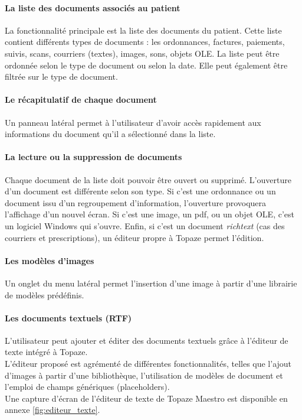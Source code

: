 \paragraph*{La liste des documents associés au patient\\}
La fonctionnalité principale est la liste des documents du patient. Cette liste contient différents types de documents : les ordonnances, factures, paiements, suivis, scans, courriers (textes), images, sons, objets \gls{OLE}. La liste peut être ordonnée selon le type de document ou selon la date. Elle peut également être filtrée sur le type de document.

\paragraph*{Le récapitulatif de chaque document\\}
Un panneau latéral permet à l'utilisateur d'avoir accès rapidement aux informations du document qu'il a sélectionné dans la liste.

\paragraph*{La lecture ou la suppression de documents\\}
Chaque document de la liste doit pouvoir être ouvert ou supprimé.
L'ouverture d'un document est différente selon son type. Si c'est une ordonnance ou un document issu d'un regroupement d'information, l'ouverture provoquera l'affichage d'un nouvel écran. Si c'est une image, un pdf, ou un objet OLE, c'est un logiciel Windows qui s'ouvre. Enfin, si c'est un document \textit{richtext} (cas des courriers et prescriptions), un éditeur propre à Topaze permet l'édition. 

\paragraph*{Les modèles d'images\\}
Un onglet du menu latéral permet l'insertion d'une image à partir d'une librairie de modèles prédéfinis.

\paragraph*{Les documents textuels (\gls{RTF})\\}
L'utilisateur peut ajouter et éditer des documents textuels grâce à l'éditeur de texte intégré à Topaze. \\
L'éditeur proposé est agrémenté de différentes fonctionnalités, telles que l'ajout d'images à partir d'une bibliothèque, l'utilisation de modèles de document et l'emploi de champs génériques (placeholders).\\
Une capture d'écran de l'éditeur de texte de Topaze Maestro est disponible en annexe \ref{fig:editeur_texte}.


